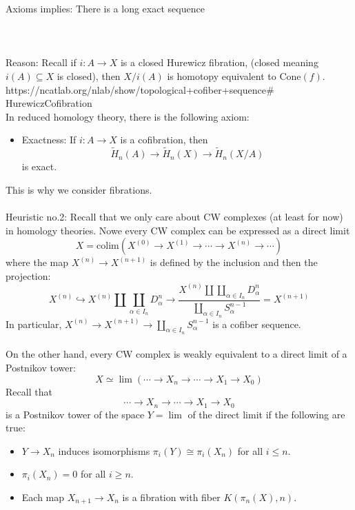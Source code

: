 \documentclass[a4paper]{article}
\begin{document}
Axioms implies: There is a long exact sequence \\~\\
\\~\\

Reason: Recall if $i:A\to X$ is a closed Hurewicz fibration, (closed meaning $i(A)\subseteq X$ is closed), then $X/i(A)$ is homotopy equivalent to $\text{Cone}(f)$. https://ncatlab.org/nlab/show/topological+cofiber+sequence\# HurewiczCofibration\\

In reduced homology theory, there is the following axiom: 
\begin{itemize}
\item Exactness: If $i:A\to X$ is a cofibration, then $$\widetilde{H}_n(A)\to\widetilde{H}_n(X)\to\widetilde{H}_n(X/A)$$ is exact. 
\end{itemize}
This is why we consider fibrations. \\~\\

Heuristic no.2: Recall that we only care about CW complexes (at least for now) in homology theories. Nowe every CW complex can be expressed as a direct limit $$X=\text{colim}\left(X^{(0)}\longrightarrow X^{(1)}\longrightarrow\cdots\longrightarrow X^{(n)}\longrightarrow\cdots\right)$$ where the map $X^{(n)}\to X^{(n+1)}$ is defined by the inclusion and then the projection: $$X^{(n)}\hookrightarrow X^{(n)}\amalg\coprod_{\alpha\in I_n}D_\alpha^n\to\frac{X^{(n)}\amalg\coprod_{\alpha\in I_n}D_\alpha^n}{\coprod_{\alpha\in I_n}S_\alpha^{n-1}}=X^{(n+1)}$$ In particular, $X^{(n)}\to X^{(n+1)}\to\coprod_{\alpha\in I_n}S_\alpha^{n-1}$ is a cofiber sequence. \\~\\

On the other hand, every CW complex is weakly equivalent to a direct limit of a Postnikov tower: $$X\simeq\lim\left(\cdots\longrightarrow X_n\longrightarrow\cdots\longrightarrow X_1\longrightarrow X_0\right)$$ Recall that $$\cdots\longrightarrow X_n\longrightarrow\cdots\longrightarrow X_1\longrightarrow X_0$$ is a Postnikov tower of the space $Y=\lim$ of the direct limit if the following are true: 
\begin{itemize}
\item $Y\to X_n$ induces isomorphisms $\pi_i(Y)\cong\pi_i(X_n)$ for all $i\leq n$. 
\item $\pi_i(X_n)=0$ for all $i\geq n$. 
\item Each map $X_{n+1}\to X_n$ is a fibration with fiber $K(\pi_n(X),n)$. 
\end{itemize}
\end{document}
